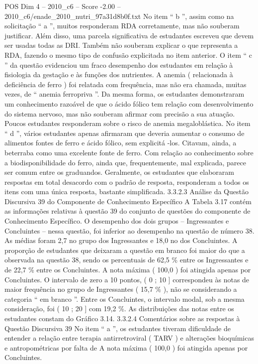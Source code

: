 \begin{textsample}{POS Dim 4 – 2010\_c6 – Score -2.00 – 2010\_c6/enade\_2010\_nutri\_97a31d8b0f.txt}
No item “ b ”, assim como na solicitação “ a ”, muitos responderam RDA corretamente, mas não souberam justificar.
Além disso, uma parcela significativa de estudantes escreveu que devem ser usadas todas as DRI.
Também não souberam explicar o que representa a RDA, fazendo o mesmo tipo de confusão explicitada no item anterior.
O item “ c ” da questão evidenciou um fraco desempenho dos estudantes em relação à fisiologia da gestação e às funções dos nutrientes.
A anemia ( relacionada à deficiência de ferro ) foi relatada com frequência, mas não era chamada, muitas vezes, de “ anemia ferropriva ”.
Da mesma forma, os estudantes demonstraram um conhecimento razoável de que o ácido fólico tem relação com desenvolvimento do sistema nervoso, mas não souberam afirmar com precisão a sua atuação.
Poucos estudantes responderam sobre o risco de anemia megaloblástica.
No item “ d ”, vários estudantes apenas afirmaram que deveria aumentar o consumo de alimentos fontes de ferro e ácido fólico, sem explicitá -los.
Citavam, ainda, a beterraba como uma excelente fonte de ferro.
Com relação ao conhecimento sobre a biodisponibilidade do ferro, ainda que, frequentemente, mal explicada, parece ser comum entre os graduandos.
Geralmente, os estudantes que elaboraram respostas em total desacordo com o padrão de resposta, responderam a todos os itens com uma única resposta, bastante simplificada. 3.3.2.3 Análise da Questão Discursiva 39 do Componente de Conhecimento Específico A Tabela 3.17 contém as informações relativas à questão 39 do conjunto de questões do componente de Conhecimento Específico.
O desempenho dos dois grupos – Ingressantes e Concluintes – nessa questão, foi inferior ao desempenho na questão de número 38.
As médias foram 2,7 no grupo dos Ingressantes e 18,0 no dos Concluintes.
A proporção de estudantes que deixaram a questão em branco foi maior do que a observada na questão 38, sendo os percentuais de 62,5 \% entre os Ingressantes e de 22,7 \% entre os Concluintes.
A nota máxima ( 100,0 ) foi atingida apenas por Concluintes.
O intervalo de zero a 10 pontos, ( 0 ; 10 ] correspondeu às notas de maior frequência no grupo de Ingressantes ( 15,7 \% ), não se considerando a categoria “ em branco ”.
Entre os Concluintes, o intervalo modal, sob a mesma consideração, foi ( 10 ; 20 ] com 19,2 \%.
As distribuições das notas entre os estudantes constam do Gráfico 3.14. 3.3.2.4 Comentários sobre as respostas à Questão Discursiva 39 No item “ a ”, os estudantes tiveram dificuldade de entender a relação entre terapia antirretroviral ( TARV ) e alterações bioquímicas e antropométricas por falta de A nota máxima ( 100,0 ) foi atingida apenas por Concluintes.

\end{textsample}
